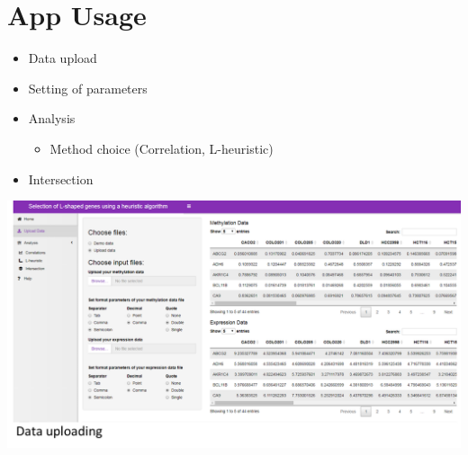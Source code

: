 \section{App Usage}

\begin{itemize}
 \item Data upload
  
\item Setting of parameters 

\item Analysis
  \begin{itemize}
    \item Method choice (Correlation, L-heuristic)
  \end{itemize} 
  
\item Intersection
  

\end{itemize} 


\begin{center}
\includegraphics[width=0.9\columnwidth]{./images/data_uploading.png}
\end{center}